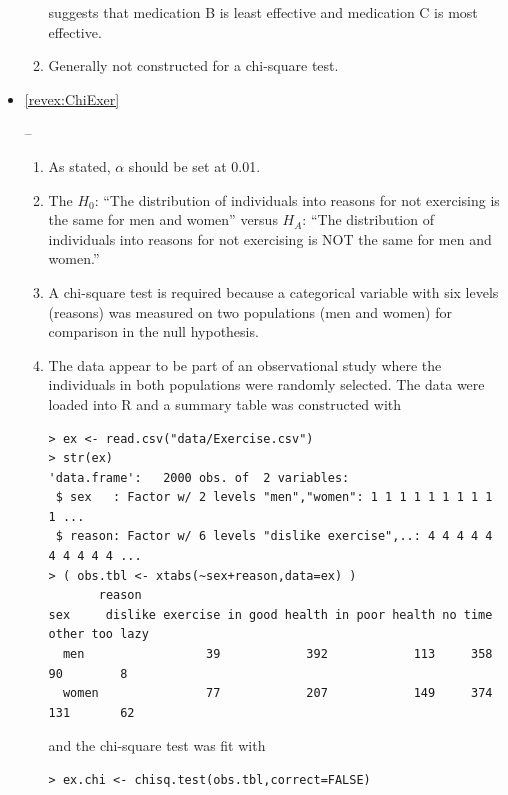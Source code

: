 \documentclass[10pt,openany]{book}\usepackage[]{graphicx}\usepackage[]{color}
\makeatletter
\newenvironment{kframe}{%
 \def\at@end@of@kframe{}%
 \ifinner\ifhmode%
  \def\at@end@of@kframe{\end{minipage}}%
  \begin{minipage}{\columnwidth}%
 \fi\fi%
 \def\FrameCommand##1{\hskip\@totalleftmargin \hskip-\fboxsep
 \colorbox{shadecolor}{##1}\hskip-\fboxsep
     \hskip-\linewidth \hskip-\@totalleftmargin \hskip\columnwidth}%
 \MakeFramed {\advance\hsize-\width
   \@totalleftmargin\z@ \linewidth\hsize
   \@setminipage}}%
 {\par\unskip\endMakeFramed%
 \at@end@of@kframe}
\newenvironment{knitrout}{}{} %
\makeatother
\begin{document}
\begin{itemize}
\begin{enumerate}
\begin{knitrout}
\end{knitrout}
suggests that medication B is least effective and medication C is most effective.
      \item Generally not constructed for a chi-square test.
    \end{enumerate}
  \item \hypertarget{ans:ChiExer}{\ref{revex:ChiExer}} --
    \begin{enumerate}
      \item As stated, $\alpha$ should be set at 0.01.
      \item The $H_{0}$: ``The distribution of individuals into reasons for not exercising is the same for men and women'' versus $H_{A}$: ``The distribution of individuals into reasons for not exercising is NOT the same for men and women.''
      \item A chi-square test is required because a categorical variable with six levels (reasons) was measured on two populations (men and women) for comparison in the null hypothesis.
      \item The data appear to be part of an observational study where the individuals in both populations were randomly selected.  The data were loaded into R and a summary table was constructed with
\begin{knitrout}
\color{fgcolor}\begin{kframe}
\begin{verbatim}
> ex <- read.csv("data/Exercise.csv")
> str(ex)
'data.frame':	2000 obs. of  2 variables:
 $ sex   : Factor w/ 2 levels "men","women": 1 1 1 1 1 1 1 1 1 1 ...
 $ reason: Factor w/ 6 levels "dislike exercise",..: 4 4 4 4 4 4 4 4 4 4 ...
> ( obs.tbl <- xtabs(~sex+reason,data=ex) )
       reason
sex     dislike exercise in good health in poor health no time other too lazy
  men                 39            392            113     358    90        8
  women               77            207            149     374   131       62
\end{verbatim}
\end{kframe}
\end{knitrout}
and the chi-square test was fit with
\begin{knitrout}
\color{fgcolor}\begin{kframe}
\begin{verbatim}
> ex.chi <- chisq.test(obs.tbl,correct=FALSE)
\end{verbatim}
\end{kframe}

\end{knitrout}
\end{enumerate}
\end{itemize}
\end{document}
